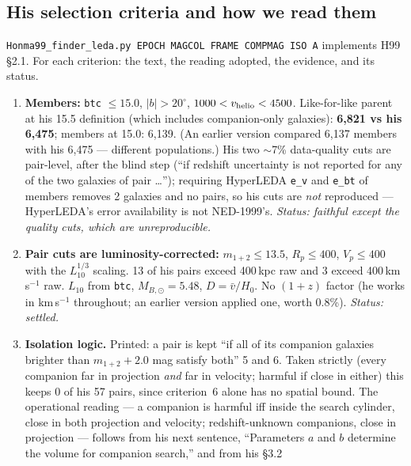 \documentclass[11pt]{article}
\begin{document}
\subsection{His selection criteria and how we read them}
\label{sec:h99sel}

\texttt{Honma99\_finder\_leda.py EPOCH MAGCOL FRAME COMPMAG ISO A} implements
H99 \S2.1. For each criterion: the text, the reading adopted, the evidence,
and its status.

\begin{enumerate}\itemsep4pt
  \item \textbf{Members:} \texttt{btc} $\le 15.0$, $|b| > 20^\circ$,
        $1000 < v_{\rm helio} < 4500$. Like-for-like parent at his 15.5
        definition (which includes companion-only galaxies): \textbf{6,821
        vs his 6,475}; members at 15.0: 6,139. (An earlier version compared
        6,137 members with his 6,475 --- different populations.) His two
        $\sim$7\% data-quality cuts are pair-level, after the blind step
        (``if redshift uncertainty is not reported for any of the two galaxies
        of pair \ldots''); requiring HyperLEDA \texttt{e\_v} and \texttt{e\_bt}
        of members removes 2 galaxies and no pairs, so his cuts are
        \emph{not} reproduced --- HyperLEDA's error availability is not
        NED-1999's. \emph{Status: faithful except the quality cuts, which are
        unreproducible.}
  \item \textbf{Pair cuts are luminosity-corrected:} $m_{1+2} \le 13.5$,
        $R_p \le 400$, $V_p \le 400$ with the $L_{10}^{1/3}$ scaling.
        13 of his pairs exceed 400\,kpc raw and 3 exceed 400\,km\,s$^{-1}$
        raw. $L_{10}$ from \texttt{btc}, $M_{B,\odot}=5.48$, $D=\bar v/H_0$.
        No $(1+z)$ factor (he works in km\,s$^{-1}$ throughout; an earlier
        version applied one, worth 0.8\%). \emph{Status: settled.}
  \item \textbf{Isolation logic.} Printed: a pair is kept ``if all of its
        companion galaxies brighter than $m_{1+2}+2.0$ mag satisfy both'' 5 and
        6. Taken strictly (every companion far in projection \emph{and} far in
        velocity; harmful if close in either) this keeps 0 of his 57 pairs,
        since criterion~6 alone has no spatial bound. The operational reading
        --- a companion is harmful iff inside the search cylinder, close in
        both projection and velocity; redshift-unknown companions, close in
        projection --- follows from his next sentence, ``Parameters $a$ and
        $b$ determine the volume for companion search,'' and from his \S3.2

\end{enumerate}
\end{document}
